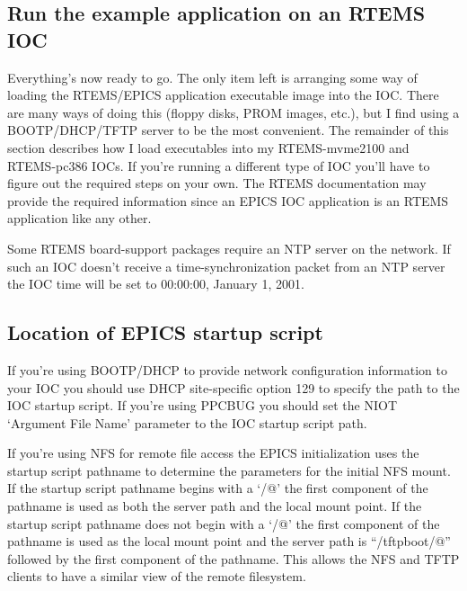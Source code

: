 \documentclass{report}
\begin{document}
\subsection{Run the example application on an RTEMS IOC}
\label{exampleApp}
Everything's now ready to go.  The only item left is arranging some
way of loading the RTEMS/EPICS application executable image into the IOC.
There are many ways of doing this (floppy disks, PROM images, etc.), but
I find using a BOOTP/DHCP/TFTP
server to be the most convenient.  The remainder of this section describes
how I load executables into my RTEMS-mvme2100 and RTEMS-pc386 IOCs.
If you're running a different type of IOC you'll have to figure out the
required steps on your own.  The RTEMS documentation may provide the
required information since an EPICS IOC application is an RTEMS application
like any other.

Some RTEMS board-support packages require an NTP server on the network.
If such an IOC doesn't receive a time-synchronization packet from an NTP
server the IOC time will be set to 00:00:00, January 1, 2001.

\subsection{Location of EPICS startup script}
If you're using BOOTP/DHCP to provide network configuration information
to your IOC you should use DHCP site-specific option 129 to specify
the path to the IOC startup script.
If you're using PPCBUG you should set the NIOT `Argument File Name' parameter
to the IOC startup script path.

If you're using NFS for remote file access the EPICS initialization uses the
startup script pathname to determine the parameters for the initial NFS mount.
If the startup script pathname begins with a `\verb@/@' the first component
of the pathname is used as both the server path and the local mount point.
If the startup script pathname does not begin with a `\verb@/@' the
first component of the pathname is used as the local mount point and the
server path is ``\verb@/tftpboot/@'' followed by the first component of
the pathname.  This allows the NFS and TFTP clients to have a similar
view of the remote filesystem.
\end{document}
